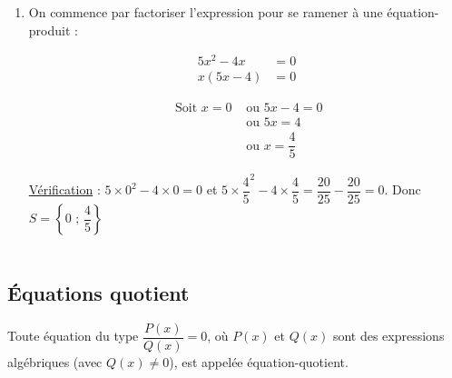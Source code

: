 \begin{Méthode}
\begin{enumerate}
\begin{minipage}[c]{0.45\linewidth}
\end{minipage}
\underline{Vérification} : $\left(3\times \dfrac{-1}{3} + 1\right)\left(1 - 6\times \dfrac{-1}{3}\right) - \left(3\times \dfrac{-1}{3} + 7\right)\left(3\times \dfrac{-1}{3} + 1\right) =0$ et \\$\left(3\times \dfrac{-2}{3} + 1\right)\left(1 - 6\times \dfrac{-2}{3}\right) - \left(3\times\dfrac{-2}{3} + 7\right)\left(3\times \dfrac{-2}{3} + 1\right) = 0$. Donc $S=\left\{\dfrac{-1}{3} \text{ ; } \dfrac{-2}{3}\right\}$
\vspace{0.2cm}
\item On commence par factoriser l'expression pour se ramener à une équation-produit :\\
\vspace{-0.2cm}
\begin{minipage}[c]{0.45\linewidth}
\begin{align*}
5x^2-4x&=0\\
x(5x-4)&=0
\end{align*}
\end{minipage} \hfill
\begin{minipage}[c]{0.45\linewidth}
\begin{align*}
\text{ Soit } x = 0 &\text{ ou } 5x-4 = 0 \\
 &\text{ ou } 5x = 4\\
&\text{ ou } x=\dfrac{4}{5}
\end{align*}
\end{minipage}

\underline{Vérification} : $5\times 0^2-4\times 0=0$ et $5\times \dfrac{4}{5}^2-4\times \dfrac{4}{5} = \dfrac{20}{25}-\dfrac{20}{25}=0$. Donc $S=\left\{0 \text{ ; } \dfrac{4}{5}\right\}$\\
~\\
\end{enumerate}


\end{Méthode}

\newpage

\subsection{Équations quotient}

\begin{Définition}
Toute équation du type $\dfrac{P(x)}{Q(x)} = 0$, où $P(x)$ et $ Q(x)$ sont des expressions algébriques (avec $Q(x) \neq 0$), est appelée équation-quotient.
\end{Définition}

